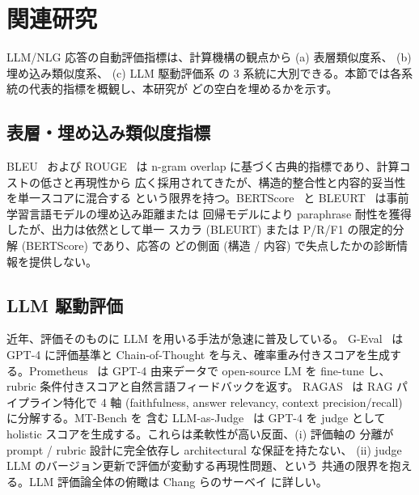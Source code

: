 %
%

\section{関連研究}
\label{sec:related_work}

LLM/NLG 応答の自動評価指標は、計算機構の観点から
(a) 表層類似度系、
(b) 埋め込み類似度系、
(c) LLM 駆動評価系
の 3 系統に大別できる。本節では各系統の代表的指標を概観し、本研究が
どの空白を埋めるかを示す。

\subsection{表層・埋め込み類似度指標}
\label{sec:rw:surface_embedding}

BLEU~\cite{papineni2002bleu} および ROUGE~\cite{lin2004rouge} は
n-gram overlap に基づく古典的指標であり、計算コストの低さと再現性から
広く採用されてきたが、構造的整合性と内容的妥当性を単一スコアに混合する
という限界を持つ。BERTScore~\cite{zhang2020bertscore} と
BLEURT~\cite{sellam2020bleurt} は事前学習言語モデルの埋め込み距離または
回帰モデルにより paraphrase 耐性を獲得したが、出力は依然として単一
スカラ (BLEURT) または P/R/F1 の限定的分解 (BERTScore) であり、応答の
どの側面 (構造 / 内容) で失点したかの診断情報を提供しない。

\subsection{LLM 駆動評価}
\label{sec:rw:llm_judge}

近年、評価そのものに LLM を用いる手法が急速に普及している。
G-Eval~\cite{liu2023geval} は GPT-4 に評価基準と Chain-of-Thought
を与え、確率重み付きスコアを生成する。Prometheus~\cite{kim2024prometheus,
kim2024prometheus2} は GPT-4 由来データで open-source LM を fine-tune
し、rubric 条件付きスコアと自然言語フィードバックを返す。
RAGAS~\cite{es2024ragas} は RAG パイプライン特化で 4 軸 (faithfulness,
answer relevancy, context precision/recall) に分解する。MT-Bench を
含む LLM-as-Judge~\cite{zheng2023judging} は GPT-4 を judge として
holistic スコアを生成する。これらは柔軟性が高い反面、(i) 評価軸の
分離が prompt / rubric 設計に完全依存し architectural な保証を持たない、
(ii) judge LLM のバージョン更新で評価が変動する再現性問題、という
共通の限界を抱える。LLM 評価論全体の俯瞰は Chang らのサーベイ
\cite{chang2024survey} に詳しい。

